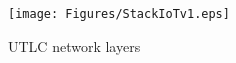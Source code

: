 %
%


\begin{figure}[!htb]
\centering
\texttt{[image: Figures/StackIoTv1.eps]}
\caption{UTLC network layers}
\label{fig:StackIoT.pdf}
\end{figure}
